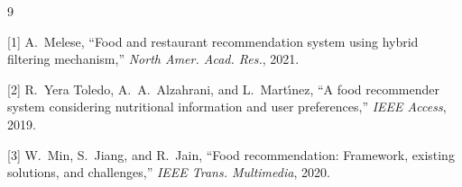 \documentclass{article}
\begin{document}
\begin{thebibliography}{9}
\small

[1] A.~Melese, ``Food and restaurant recommendation system using hybrid filtering mechanism,'' \emph{North Amer. Acad. Res.}, 2021.

[2] R.~Yera Toledo, A.~A.~Alzahrani, and L.~Mart{\'\i}nez, ``A food recommender system considering nutritional information and user preferences,'' \emph{IEEE Access}, 2019.

[3] W.~Min, S.~Jiang, and R.~Jain, ``Food recommendation: Framework, existing solutions, and challenges,'' \emph{IEEE Trans. Multimedia}, 2020.

\end{thebibliography}

\end{document}
